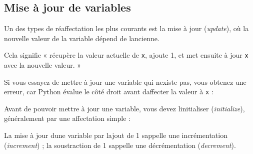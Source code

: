 \hypertarget{mise-uxe0-jour-de-variables}{%
\subsection{Mise à jour de
variables}\label{mise-uxe0-jour-de-variables}}

Un des types de réaffectation les plus courants est la mise à jour
(\emph{update}), où la nouvelle valeur de la variable dépend de
l\textquotesingle ancienne.

\begin{Shaded}
\begin{Highlighting}[]
\OperatorTok{=}\OperatorTok{+} 
\end{Highlighting}
\end{Shaded}

Cela signifie « récupère la valeur actuelle de \texttt{x}, ajoute 1, et
met ensuite à jour \texttt{x} avec la nouvelle valeur. »

Si vous essayez de mettre à jour une variable qui
n\textquotesingle existe pas, vous obtenez une erreur, car Python évalue
le côté droit avant d\textquotesingle affecter la valeur à \texttt{x} :

\begin{Shaded}
\begin{Highlighting}[]
\OperatorTok{\textgreater{}\textgreater{}\textgreater{}}\OperatorTok{=}\OperatorTok{+} 
  
\end{Highlighting}
\end{Shaded}

Avant de pouvoir mettre à jour une variable, vous devez
l\textquotesingle initialiser (\emph{initialize}), généralement par une
affectation simple :

\begin{Shaded}
\begin{Highlighting}[]
\OperatorTok{\textgreater{}\textgreater{}\textgreater{}}\OperatorTok{=} 
\OperatorTok{\textgreater{}\textgreater{}\textgreater{}}\OperatorTok{=}\OperatorTok{+} 
\end{Highlighting}
\end{Shaded}

La mise à jour d\textquotesingle une variable par
l\textquotesingle ajout de 1 s\textquotesingle appelle une
incrémentation (\emph{increment}) ; la soustraction de 1
s\textquotesingle appelle une décrémentation (\emph{decrement}).

